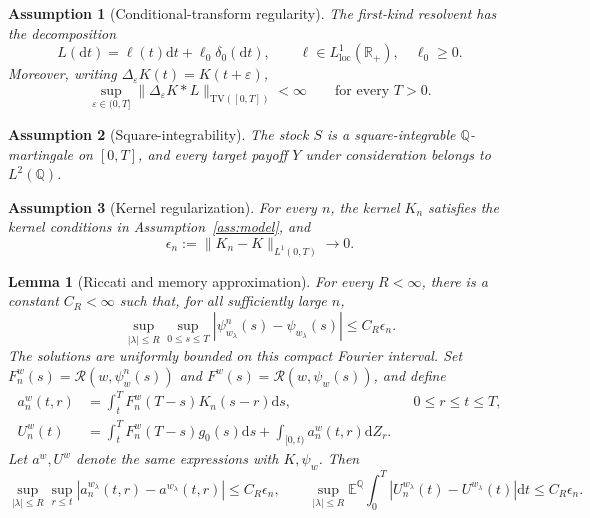 \documentclass[10pt,a4paper]{amsart}
\newtheorem{assumption}{Assumption}
\newtheorem{lemma}{Lemma}
\newcommand{\E}{\mathbb{E}}
\newcommand{\Q}{\mathbb{Q}}
\newcommand{\R}{\mathbb{R}}
\newcommand{\Rr}{\mathcal{R}}
\newcommand{\dd}{\mathrm{d}}
\begin{document}
\begin{assumption}[Conditional-transform regularity]
\label{ass:transform}
The first-kind resolvent has the decomposition
\[
 L(\dd t)=\ell(t)\dd t+\ell_0\delta_0(\dd t),
 \qquad \ell\in L^1_{\mathrm{loc}}(\R_+),\quad \ell_0\geq0.
\]
Moreover, writing $\Delta_\varepsilon K(t)=K(t+\varepsilon)$,
\[
 \sup_{\varepsilon\in(0,T]}
 \|\Delta_\varepsilon K*L\|_{\mathrm{TV}([0,T])}<\infty
 \qquad\text{for every }T>0.
\]
\end{assumption}

\begin{assumption}[Square-integrability]
\label{ass:l2}
The stock $S$ is a square-integrable $\Q$-martingale on $[0,T]$,
and every target payoff $Y$ under consideration belongs to $L^2(\Q)$.
\end{assumption}

\begin{assumption}[Kernel regularization]
\label{ass:original-kernel-regularization}
For every $n$, the kernel $K_n$ satisfies the kernel conditions in
Assumption~\ref{ass:model}, and
\[
 \epsilon_n:=\|K_n-K\|_{L^1(0,T)}\longrightarrow0.
\]
\end{assumption}

\begin{lemma}[Riccati and memory approximation]
\label{lem:original-deterministic-stability}
For every $R<\infty$, there is a constant $C_R<\infty$ such that, for all
sufficiently large $n$,
\begin{equation}
\label{eq:original-riccati-stability}
 \sup_{|\lambda|\leq R}\sup_{0\leq s\leq T}
 |\psi_{w_\lambda}^n(s)-\psi_{w_\lambda}(s)|\leq C_R\epsilon_n.
\end{equation}
The solutions are uniformly bounded on this compact Fourier interval.
Set $F_n^w(s)=\Rr(w,\psi_w^n(s))$ and $F^w(s)=\Rr(w,\psi_w(s))$, and define
\begin{align}
 a_n^w(t,r)&=\int_t^T F_n^w(T-s)K_n(s-r)\dd s,
       &&0\leq r\leq t\leq T,\label{eq:original-memory-coefficient}\\
 U_n^w(t)&=\int_t^T F_n^w(T-s)g_0(s)\dd s
       +\int_{[0,t)}a_n^w(t,r)\dd Z_r.
       \label{eq:original-log-memory}
\end{align}
Let $a^w,U^w$ denote the same expressions with $K,\psi_w$. Then
\begin{equation}
\label{eq:original-memory-stability}
 \sup_{|\lambda|\leq R}\sup_{r\leq t}|a_n^{w_\lambda}(t,r)-a^{w_\lambda}(t,r)|
 \leq C_R\epsilon_n,
 \qquad
 \sup_{|\lambda|\leq R}\E^\Q\!\int_0^T
 |U_n^{w_\lambda}(t)-U^{w_\lambda}(t)|\dd t
 \leq C_R\epsilon_n.
\end{equation}
\end{lemma}
\end{document}
